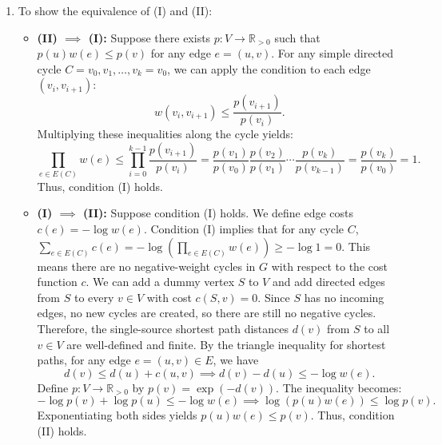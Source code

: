 \documentclass{article}
\begin{document}
\begin{enumerate}[label=\fbox{\arabic*}]
  \item %
        To show the equivalence of (I) and (II):
        \begin{itemize}
          \item \textbf{(II) $\implies$ (I):} Suppose there exists $p: V \to \mathbb{R}_{>0}$ such that $p(u)w(e) \le p(v)$ for any edge $e = (u,v)$.
          For any simple directed cycle $C = v_0, v_1, \dots, v_k = v_0$, we can apply the condition to each edge $(v_i, v_{i+1})$:
          \[
            w(v_i, v_{i+1}) \le \frac{p(v_{i+1})}{p(v_i)}.
          \]
          Multiplying these inequalities along the cycle yields:
          \[
            \prod_{e \in E(C)} w(e) \le \prod_{i=0}^{k-1} \frac{p(v_{i+1})}{p(v_i)} = \frac{p(v_1)}{p(v_0)} \frac{p(v_2)}{p(v_1)} \cdots \frac{p(v_k)}{p(v_{k-1})} = \frac{p(v_k)}{p(v_0)} = 1.
          \]
          Thus, condition (I) holds.
          
          \item \textbf{(I) $\implies$ (II):} Suppose condition (I) holds. We define edge costs $c(e) = -\log w(e)$. 
          Condition (I) implies that for any cycle $C$, $\sum_{e \in E(C)} c(e) = -\log \left( \prod_{e \in E(C)} w(e) \right) \ge -\log 1 = 0$.
          This means there are no negative-weight cycles in $G$ with respect to the cost function $c$.
          We can add a dummy vertex $S$ to $V$ and add directed edges from $S$ to every $v \in V$ with cost $c(S, v) = 0$. Since $S$ has no incoming edges, no new cycles are created, so there are still no negative cycles.
          Therefore, the single-source shortest path distances $d(v)$ from $S$ to all $v \in V$ are well-defined and finite.
          By the triangle inequality for shortest paths, for any edge $e = (u, v) \in E$, we have
          \[
            d(v) \le d(u) + c(u, v) \implies d(v) - d(u) \le -\log w(e).
          \]
          Define $p: V \to \mathbb{R}_{>0}$ by $p(v) = \exp(-d(v))$. The inequality becomes:
          \[
            -\log p(v) + \log p(u) \le -\log w(e) \implies \log(p(u) w(e)) \le \log p(v).
          \]
          Exponentiating both sides yields $p(u) w(e) \le p(v)$. Thus, condition (II) holds.
        \end{itemize}


\end{enumerate}
\end{document}
